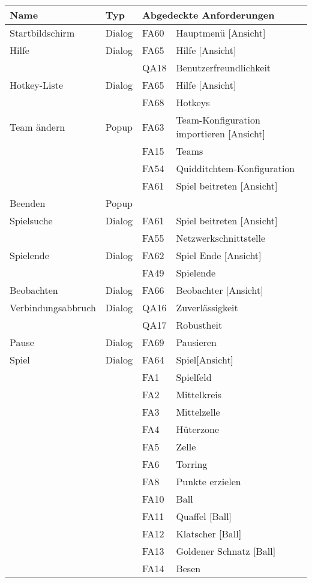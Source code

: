 

\begin{tabular}{| l l l l |}
	\hline
	\textbf{Name} & \textbf{Typ} & \multicolumn{2}{l|}{\textbf{Abgedeckte Anforderungen}} \\\hline
	Startbildschirm & Dialog & FA60 & Hauptmenü [Ansicht]\\\hline
	Hilfe & Dialog & FA65 & Hilfe [Ansicht]\\
	& & QA18 & Benutzerfreundlichkeit\\\hline
	Hotkey-Liste & Dialog & FA65 & Hilfe [Ansicht]\\
	& & FA68 & Hotkeys\\\hline
	Team ändern & Popup & FA63 & Team-Konfiguration importieren [Ansicht]\\
	& & FA15 & Teams\\
	& & FA54 & Quidditchtem-Konfiguration\\
	& & FA61 & Spiel beitreten [Ansicht]\\\hline
	Beenden & Popup & & \\\hline
	Spielsuche & Dialog & FA61 & Spiel beitreten [Ansicht]\\
	& & FA55 & Netzwerkschnittstelle\\\hline
	Spielende & Dialog & FA62 & Spiel Ende [Ansicht]\\
	& & FA49 & Spielende\\\hline
	Beobachten & Dialog & FA66 & Beobachter [Ansicht]\\\hline
	Verbindungsabbruch & Dialog & QA16 & Zuverlässigkeit\\
	& & QA17 & Robustheit\\\hline
	Pause & Dialog & FA69 & Pausieren\\\hline
	Spiel & Dialog & FA64 & Spiel[Ansicht]\\
	& & FA1 & Spielfeld\\
	& & FA2 & Mittelkreis\\
	& & FA3 & Mittelzelle\\
	& & FA4 & Hüterzone\\
	& & FA5 & Zelle\\
	& & FA6 & Torring\\
	& & FA8 & Punkte erzielen\\
	& & FA10 & Ball\\
	& & FA11 & Quaffel [Ball]\\
	& & FA12 & Klatscher [Ball]\\
	& & FA13 & Goldener Schnatz [Ball]\\
	& & FA14 & Besen\\

\end{tabular}
